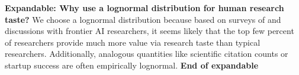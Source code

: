 \documentclass{article}
\theoremstyle{definition}
\begin{document}
\textbf{Expandable: Why use a lognormal distribution for human research taste?} We choose a lognormal distribution because based on surveys of and discussions with frontier AI researchers, it seems likely that the top few percent of researchers provide much more value via research taste than typical researchers. Additionally, analogous quantities like scientific citation counts or startup success are often empirically lognormal. \textbf{End of expandable}

\end{document}
